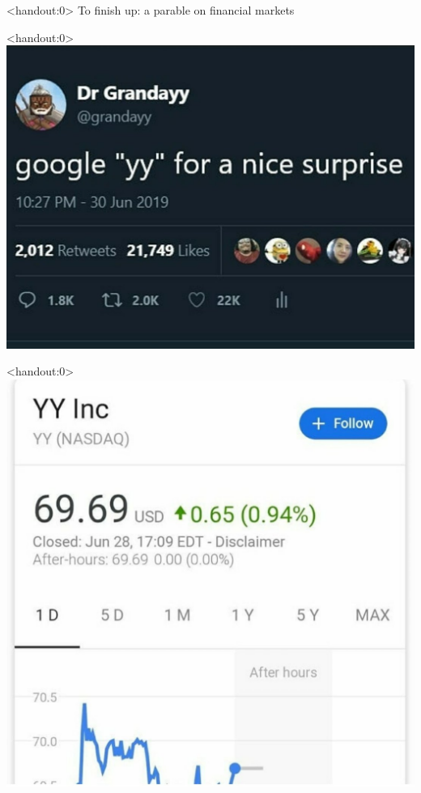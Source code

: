 \documentclass[english,10pt
,aspectratio=169
]{beamer}
\begin{document}
\appendix
\begin{frame}<handout:0>
	To finish up: a parable on financial markets 
\end{frame}

\begin{frame}<handout:0>
	\centering \includegraphics[width=0.55\paperwidth]{pics/yy1}
\end{frame}


\begin{frame}<handout:0>
	\centering \includegraphics[width=0.55\paperwidth]{pics/yy2}
\end{frame}
\end{document}
